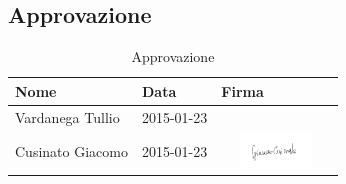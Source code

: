 	\subsection{Approvazione} %
	\label{sub:approvazione}
		\begin{table}[!h]
			\begin{center}
				\begin{tabularx}{0.8\textwidth}{|X|X|X|}
					\hline
					\textbf{Nome} & \textbf{Data} & \textbf{Firma} \\
					\hline
					\rule[-4mm]{0mm}{1cm}
					Vardanega Tullio &
					2015-01-23 &
					\\
					\hline
					\rule[-4mm]{0mm}{1cm}
					Cusinato Giacomo &
					2015-01-23 &
					\includegraphics[height=0.9cm,width=2.9cm]{./images/firme/giacomo.png} \\
					\hline
				\end{tabularx}
			\end{center}
		\caption{Approvazione}
		\end{table}
	
